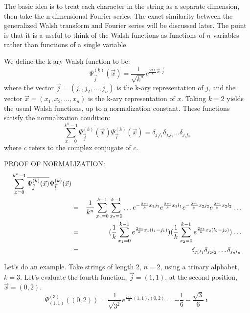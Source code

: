 The basic idea is to treat each character in the string as a separate
dimension, then take the n-dimensional Fourier series.  The exact similarity
between the generalized Walsh transform and Fourier series will be discussed
later.  The point is that it is a useful to think of the Walsh functions
as functions of $n$ variables rather than functions of a single variable.

We define the k-ary Walsh function to be:
\begin{equation}
\Psi^{(k)}_{\vec j}(\vec x) = {\frac{1}{\sqrt{k^n}}
	e^{\frac{2 \pi \imath}{k} \vec x .\vec j }}
\end{equation}
where the vector $\vec j =(j_1,j_2,\ldots,j_n)$ is the k-ary representation
of $j$, and the vector $\vec x =(x_1,x_2,\ldots,x_n)$ is the k-ary 
representation of $x$.
Taking $k=2$ yields the usual Walsh functions, up to a normalization constant.
These functions satisfy the normalization condition:
\begin{equation}
\sum_{x=0}^{k^n-1}{\overline{\Psi^{(k)}_{\vec j}(\vec x)}
	\Psi^{(k)}_{\vec l}(\vec x)}=
	\delta_{j_1 l_1} \delta_{j_2 l_2} \ldots \delta_{j_n l_n}
\end{equation}
where $\overline{c}$ refers to the complex conjugate of $c$.

PROOF OF NORMALIZATION:
\begin{eqnarray}
\sum_{x=0}^{k^n-1}{\overline{\Psi^{(k)}_{\vec j}(\vec x)}
	\Psi^{(k)}_{\vec l}(\vec x)} \lefteqn \nonumber \\
	&= &\frac{1}{k^n}\sum_{x_1=0}^{k-1}{\sum_{x_2=0}^{k-1}{\ldots
		e^{- \frac{2 \pi \imath}{k} x_1 j_1}
		e^{\frac{2 \pi \imath}{k} x_1 l_1}
		e^{- \frac{2 \pi \imath}{k} x_2 j_2}
		e^{\frac{2 \pi \imath}{k} x_2 l_2}
		\ldots
		}} \nonumber \\
	&= & (\frac{1}{k}\sum_{x_1=0}^{k-1}
		{e^{\frac{2 \pi \imath}{k} x_1 (l_1-j_1)}})
	     (\frac{1}{k}\sum_{x_2=0}^{k-1}
		{e^{\frac{2 \pi \imath}{k} x_2 (l_2-j_2)}})
		\ldots \nonumber \\
	&=& \delta_{j_1 l_1} \delta_{j_2 l_2} \ldots \delta_{j_n l_n}
\end{eqnarray}

Let's do an example.  Take strings of length 2, $n=2$, using a trinary
alphabet, $k=3$.  Let's evaluate the fourth function, $\vec{j}=(1,1)$, at 
the second position, $\vec{x}=(0,2)$.
\begin{equation}
\Psi^{(3)}_{(1,1)}((0,2))=\frac{1}{\sqrt{3^2}}
	e^{\frac{2 \pi \imath}{3} (1,1).(0,2)}=
	-\frac{1}{6} - \frac{\sqrt{3}}{6} \imath
\end{equation}

